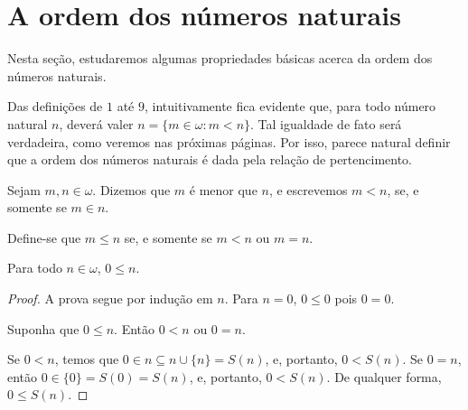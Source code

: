 \section{A ordem dos números naturais}\label{subsec:ordemDosNaturais}

Nesta seção, estudaremos algumas propriedades básicas acerca da ordem dos números naturais.

Das definições de $1$ até $9$, intuitivamente fica evidente que, para todo número natural $n$, deverá valer $n = \{m \in \omega: m<n\}$.
Tal igualdade de fato será verdadeira, como veremos nas próximas páginas.
Por isso, parece natural definir que a ordem dos números naturais é dada pela relação de pertencimento.

\begin{definition}[$Z^--P$]\label{def:ordemDosNaturais}
    Sejam $m, n \in \omega$.
    Dizemos que $m$ é menor que $n$, e escrevemos $m < n$, se, e somente se $m \in n$.

    Define-se que $m\leq n$ se, e somente se $m < n$ ou $m = n$.
\end{definition}

\begin{lemma}[$Z^--P$]\label{lem:zeroMenorIgualATodoNatural}
    Para todo $n \in \omega$, $0\leq n$.
\end{lemma}
\begin{proof}
    A prova segue por indução em $n$.
    Para $n=0$, $0\leq 0$ pois $0=0$.
    
    Suponha que $0\leq n$.
    Então $0<n$ ou $0=n$.

    Se $0<n$, temos que $0\in n\subseteq n\cup\{n\}=S(n)$, e, portanto, $0<S(n)$.
    Se $0=n$, então $0\in \{0\}=S(0)=S(n)$, e, portanto, $0<S(n)$.
    De qualquer forma, $0\leq S(n)$.
\end{proof}

